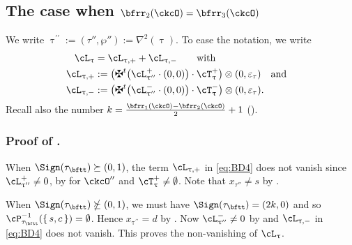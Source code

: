 \documentclass[12pt,a4paper]{amsart}
\newcommand{\trivial}[2][]{\if\relax\detokenize{#1}\relax
  {%
      \color{orange} \vspace{0em} $[$  #2 $]$
      \color{black}
  }
  \else
\ifx#1h
\ifcsname showtrivial\endcsname
{%
    \color{orange} \vspace{0em}  $[$ #2 $]$
    \color{black}
}
\fi
\else {\red Wrong argument!} \fi
\fi
}
\newcommand{\AC}{\mathrm{AC}}
\def\MYD{{\mathsf{MYD}}}
\def\DD{\nabla}
\numberwithin{equation}{section}
\theoremstyle{remark}
\def\uptaupp{\uptau^{\prime\prime}}
\begin{document}







\subsection*{The case when $\bfrr_{2}(\ckcO)=\bfrr_{3}(\ckcO)$}
\def\ppac#1{\cL_{#1,+}}
\def\nnac#1{\cL_{#1,-}}

We write $\uptaupp :=(\tau'',\wp''):= \DD^{2}(\uptau)$.
To ease the notation, we write
\begin{equation}
 \label{eq:BD4}
  \begin{split}
    \ac_{\uptau} & = \ppac{\uptau} + \nnac{\uptau} \qquad \text{with} \\
  \ppac{\uptau} & := \left(\maltese^t \big(\pac{\uptaupp}\cdot (0,0)\big) \cdot \pcT_{\uptau}\right)\lotimes (0,\varepsilon_\tau) \AND \\
  \nnac{\uptau} & := \left(\maltese^t \big(\nac{\uptaupp}\cdot (0,0)\big) \cdot \ncT_{\uptau}\right)\lotimes (0,\varepsilon_\tau).
  \end{split}
\end{equation}
Recall also the number $k = \frac{\bfrr_1(\ckcO)-\bfrr_2(\ckcO)}{2}+1$ ().

\subsubsection*{Proof of . }

When $\Sign(\tau_{\bftt})\succeq (0,1)$, the term $\ppac{\uptau}$ in \eqref{eq:BD4} does
not vanish since $\pac{\uptaupp}\neq 0$, by  for $\ckcO''$ and $\pcT_{\uptau}\neq \emptyset$. Note that $x_{\tau''}\neq s$ by .

When $\Sign(\tau_{\bftt})\nsucceq (0,1)$, we must have $\Sign(\tau_{\bftt}) =
(2k,0)$ and so $\cP_{\tau_{\bftt}}^{-1}(\set{s,c})=\emptyset$. Hence
$x_{\uptaupp}=d$ by . Now $\nac{\uptaupp} \neq 0$ by
 and $\nnac{\uptau}$  in \eqref{eq:BD4} does not vanish.
This proves the non-vanishing of $\ac_{\uptau}$.
\end{document}

